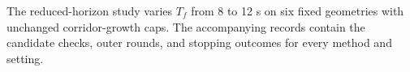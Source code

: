The reduced-horizon study varies $T_f$ from 8 to 12 s on six fixed geometries with unchanged corridor-growth caps. The accompanying records contain the candidate checks, outer rounds, and stopping outcomes for every method and setting.
